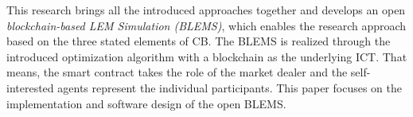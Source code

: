 This research brings all the introduced approaches together 
and develops an open \textit{blockchain-based LEM Simulation (BLEMS)}, which enables the research 
approach based on the three stated elements of CB. The BLEMS is realized through 
the introduced optimization algorithm with a blockchain as the underlying ICT. 
That means, the smart contract takes the role of the market dealer and the self-interested 
agents represent the individual participants. This paper focuses on the 
implementation and software design of the open BLEMS.
